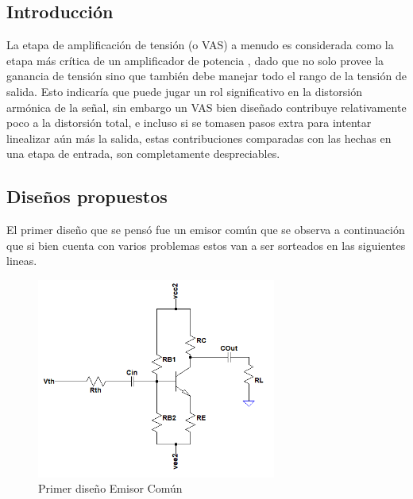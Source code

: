 %
%
%

\subsection{Introducción}
La etapa de amplificación de tensión (o VAS) a menudo es considerada como la etapa más crítica de un amplificador de potencia , dado que no solo provee la ganancia de tensión sino que también debe manejar todo el rango de la tensión de salida. Esto indicaría que puede jugar un rol significativo en la distorsión armónica de la señal, sin embargo un VAS bien diseñado contribuye relativamente poco a la distorsión total, e incluso si se tomasen pasos extra para intentar linealizar aún más la salida, estas contribuciones comparadas con las hechas en una etapa de entrada, son completamente despreciables.\\
\subsection{Diseños propuestos}
El primer diseño que se pensó fue un emisor común que se observa a continuación que si bien  cuenta con varios problemas estos van  a ser sorteados en las siguientes lineas.
\begin{figure}[H]
\centering
	\includegraphics[width=0.7\textwidth]{ImagenesGain-Stage/ec1.png}
	\caption{Primer diseño Emisor Común}
	\label{fig:ec1}
\end{figure}

